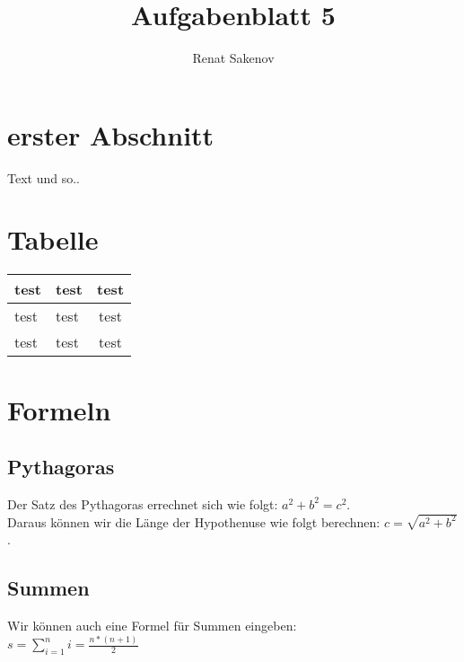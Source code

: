 \documentclass[30p]{article}
\author{Renat Sakenov}
\title{Aufgabenblatt 5 }
\begin{document}
\maketitle

\section{erster Abschnitt} 
Text und so.. \\

\section{Tabelle}
\begin{tabular}[]{| p{3cm} | p{3cm} | c |}
test &  test & test\\  \hline
test &  test & test\\
test &  test & test\\

\end{tabular}


\section{Formeln}
\subsection{Pythagoras}

Der Satz des Pythagoras errechnet sich wie folgt: $a^2+b^2 = c^2$.\\ 
Daraus können wir die Länge der Hypothenuse wie folgt berechnen: $c = \sqrt{a^2+b^2}$.

\subsection{Summen}
Wir können auch eine Formel für Summen eingeben: \\
$s = \sum_{i=1}^{n} i = \frac{n * (n+1)}{2}$
   
\end{document}
